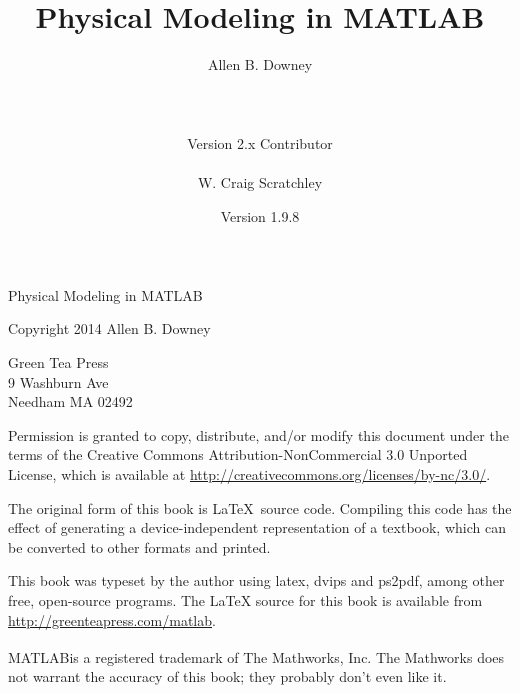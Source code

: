 \documentclass{book}
\newcommand{\myreg}{\textsuperscript{{\tiny \textregistered}}}
\begin{document}
\frontmatter


\newcommand{\thetitle}{Physical Modeling in MATLAB\myreg}
\newcommand{\theversion}{1.9.8}
\title {\thetitle}
\author {Allen B. Downey \\\\\\\\
Version 2.x Contributor\\\\
W. Craig Scratchley\\}
\date {Version \theversion}





\begin{latexonly}



\maketitle

\vspace{2in}

\begin{center}
{\Large \thetitle}

\vspace{0.25in}

Copyright 2014 Allen B. Downey
\end{center}

\vspace{0.25in}

\begin{flushleft}
Green Tea Press       \\
9 Washburn Ave \\
Needham MA 02492
\end{flushleft}

Permission is granted to copy, distribute, and/or modify this document
under the terms of the Creative Commons Attribution-NonCommercial 3.0 Unported
License, which is available at \url{http://creativecommons.org/licenses/by-nc/3.0/}.

The original form of this book is \LaTeX\ source code.  Compiling this
code has the effect of generating a device-independent representation
of a textbook, which can be converted to other formats and printed.

This book was typeset by the author using latex, dvips and ps2pdf,
among other free, open-source programs.
The LaTeX source for this book is available from
\url{http://greenteapress.com/matlab}.

MATLAB\myreg is a registered trademark of The
Mathworks, Inc.  The Mathworks does not warrant the accuracy
of this book; they probably don't even like it.

\end{latexonly}
\end{document}
